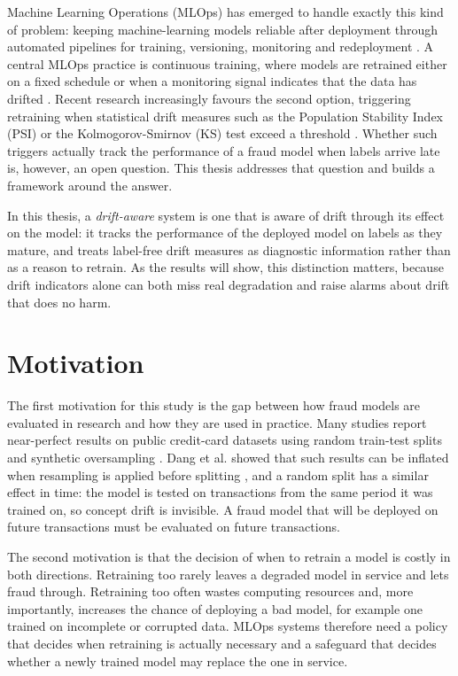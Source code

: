 Machine Learning Operations (MLOps) has emerged to handle exactly this kind of problem: keeping machine-learning models reliable after deployment through automated pipelines for training, versioning, monitoring and redeployment \cite{pulicharla2019,kodakandla2024}. A central MLOps practice is continuous training, where models are retrained either on a fixed schedule or when a monitoring signal indicates that the data has drifted \cite{pulicharla2019}. Recent research increasingly favours the second option, triggering retraining when statistical drift measures such as the Population Stability Index (PSI) or the Kolmogorov-Smirnov (KS) test exceed a threshold \cite{shakil2025,wong2025}. Whether such triggers actually track the performance of a fraud model when labels arrive late is, however, an open question. This thesis addresses that question and builds a framework around the answer.

In this thesis, a \textit{drift-aware} system is one that is aware of drift through its effect on the model: it tracks the performance of the deployed model on labels as they mature, and treats label-free drift measures as diagnostic information rather than as a reason to retrain. As the results will show, this distinction matters, because drift indicators alone can both miss real degradation and raise alarms about drift that does no harm.

\section{Motivation}

The first motivation for this study is the gap between how fraud models are evaluated in research and how they are used in practice. Many studies report near-perfect results on public credit-card datasets using random train-test splits and synthetic oversampling \cite{mienye2023}. Dang et al. showed that such results can be inflated when resampling is applied before splitting \cite{dang2021}, and a random split has a similar effect in time: the model is tested on transactions from the same period it was trained on, so concept drift is invisible. A fraud model that will be deployed on future transactions must be evaluated on future transactions.

The second motivation is that the decision of when to retrain a model is costly in both directions. Retraining too rarely leaves a degraded model in service and lets fraud through. Retraining too often wastes computing resources and, more importantly, increases the chance of deploying a bad model, for example one trained on incomplete or corrupted data. MLOps systems therefore need a policy that decides when retraining is actually necessary and a safeguard that decides whether a newly trained model may replace the one in service.

